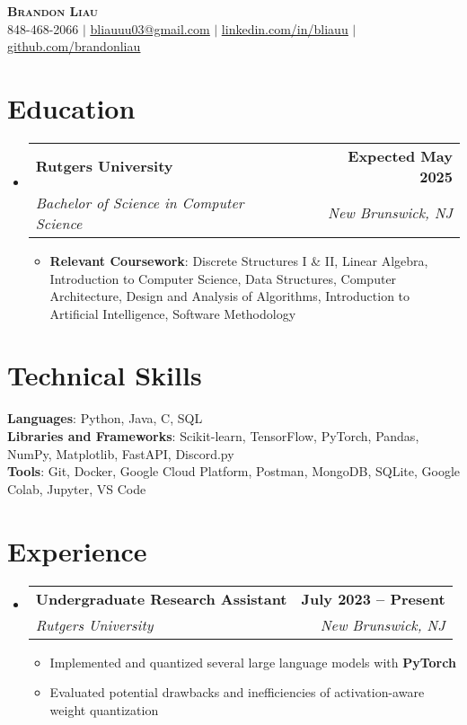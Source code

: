 \documentclass[letterpaper,11pt]{article}
\makeatletter
\newcommand{\resumeItem}[1]{
  \item\small{
    {#1 \vspace{-2pt}}
  }
}
\newcommand{\resumeSubheading}[4]{
  \vspace{-2pt}\item
    \begin{tabular*}{0.97\textwidth}[t]{l@{\extracolsep{\fill}}r}
      \textbf{#1} & #2 \\
      \textit{\small#3} & \textit{\small #4} \\
    \end{tabular*}\vspace{-7pt}
}
\newcommand{\resumeSubHeadingListStart}{\begin{itemize}[leftmargin=0.15in, label={}]}
\newcommand{\resumeSubHeadingListEnd}{\end{itemize}}
\newcommand{\resumeItemListStart}{\begin{itemize}}
\newcommand{\resumeItemListEnd}{\end{itemize}\vspace{-3pt}}
\makeatother
\begin{document}
\begin{center}
    \textbf{\Huge \scshape Brandon Liau} \\ \vspace{8pt}
    \small {} 848-468-2066 $|$ 
    \href{mailto:x@x.com}{ \underline{bliauuu03@gmail.com}} $|$ 
    \href{https://linkedin.com/in/bliauu}{ \underline{linkedin.com/in/bliauu}} $|$
    \href{https://github.com/brandonliau}{ \underline{github.com/brandonliau}}
\end{center}


\section{Education}
  \resumeSubHeadingListStart
    \resumeSubheading
      {Rutgers University}{\textbf{Expected May 2025}}
      {Bachelor of Science in Computer Science}{New Brunswick, NJ}
      \resumeItemListStart
        \resumeItem{\textbf{Relevant Coursework}: Discrete Structures I \& II, Linear Algebra, Introduction to Computer Science, Data Structures, Computer Architecture, Design and Analysis of Algorithms, Introduction to Artificial Intelligence, Software Methodology}
      \resumeItemListEnd
  \resumeSubHeadingListEnd


\section{Technical Skills}
 \begin{itemize}[leftmargin=0.15in, label={}]
    \small{\item{
     \textbf{Languages}{: Python, Java, C, SQL} \vspace{1.5pt}\\
     \textbf{Libraries and Frameworks}{: Scikit-learn, TensorFlow, PyTorch, Pandas, NumPy, Matplotlib, FastAPI, Discord.py} \vspace{1.5pt}\\
     \textbf{Tools}{: Git, Docker, Google Cloud Platform, Postman, MongoDB, SQLite, Google Colab, Jupyter, VS Code} \\
    }}
 \end{itemize}


\section{Experience}
  \resumeSubHeadingListStart
    \resumeSubheading
      {Undergraduate Research Assistant}{\textbf{July 2023 -- Present}}
      {Rutgers University}{New Brunswick, NJ}
      \resumeItemListStart
        \resumeItem{Implemented and quantized several large language models with \textbf{PyTorch}}
        \resumeItem{Evaluated potential drawbacks and inefficiencies of activation-aware weight quantization}
      \resumeItemListEnd
  \resumeSubHeadingListEnd
\end{document}
